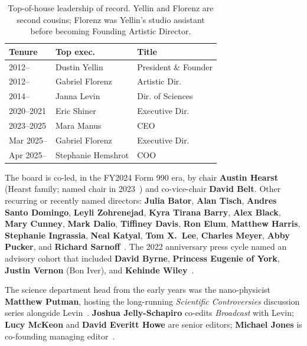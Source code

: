 \documentclass[10pt,letterpaper,twocolumn]{article}
\begin{document}
\begin{table}[h]
\footnotesize
\centering
\setlength{\tabcolsep}{3pt}
\begin{tabularx}{\columnwidth}{lXX}
\toprule
\textbf{Tenure} & \textbf{Top exec.} & \textbf{Title} \\
\midrule
2012-- & Dustin Yellin & President \& Founder \\
2012-- & Gabriel Florenz & Artistic Dir. \\
2014-- & Janna Levin & Dir. of Sciences \\
2020--2021 & Eric Shiner & Executive Dir. \\
2023--2025 & Mara Manus & CEO \\
Mar 2025-- & Gabriel Florenz & Executive Dir. \\
Apr 2025-- & Stephanie Hemshrot & COO \\
\bottomrule
\end{tabularx}
\caption{Top-of-house leadership of record. Yellin and Florenz are second cousins; Florenz was Yellin's studio assistant before becoming Founding Artistic Director.}
\label{tab:eds}
\end{table}

The board is co-led, in the FY2024 Form 990 era, by chair \textbf{Austin Hearst} (Hearst family; named chair in 2023~\citep{artforum2023manus}) and co-vice-chair \textbf{David Belt}. Other recurring or recently named directors: \textbf{Julia Bator}, \textbf{Alan Tisch}, \textbf{Andres Santo Domingo}, \textbf{Leyli Zohrenejad}, \textbf{Kyra Tirana Barry}, \textbf{Alex Black}, \textbf{Mary Cunney}, \textbf{Mark Dalio}, \textbf{Tiffiney Davis}, \textbf{Ron Elum}, \textbf{Matthew Harris}, \textbf{Stephanie Ingrassia}, \textbf{Neal Katyal}, \textbf{Tom X.~Lee}, \textbf{Charles Meyer}, \textbf{Abby Pucker}, and \textbf{Richard Sarnoff}~\citep{prnewswire2019shiner,artforum2023manus}. The 2022 anniversary press cycle named an advisory cohort that included \textbf{David Byrne}, \textbf{Princess Eugenie of York}, \textbf{Justin Vernon} (Bon Iver), and \textbf{Kehinde Wiley}~\citep{bkmag2022pioneer}.

The science department head from the early years was the nano-physicist \textbf{Matthew Putman}, hosting the long-running \emph{Scientific Controversies} discussion series alongside Levin~\citep{wikipedia2026pioneer}. \textbf{Joshua Jelly-Schapiro} co-edits \emph{Broadcast} with Levin; \textbf{Lucy McKeon} and \textbf{David Everitt Howe} are senior editors; \textbf{Michael Jones} is co-founding managing editor~\citep{starrevue2024broadcast}.
\end{document}
